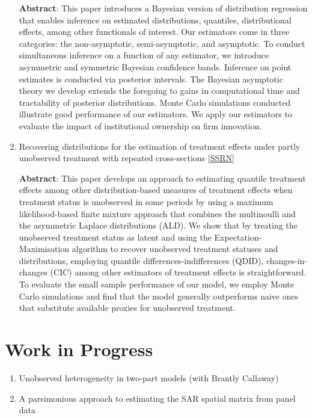 \documentclass[12pt,letterpaper]{article}
\begin{document}
\begin{enumerate}
	\textbf{Abstract}: This paper introduces a Bayesian version of distribution regression that enables inference on estimated distributions, quantiles, distributional effects, among other functionals of interest. Our estimators come in three categories: the non-asymptotic, semi-asymptotic, and asymptotic. To conduct simultaneous inference on a function of any estimator, we introduce asymmetric and symmetric Bayesian confidence bands. Inference on point estimates is conducted via posterior intervals. The Bayesian asymptotic theory we develop extends the foregoing to gains in computational time and tractability of posterior distributions. Monte Carlo simulations conducted illustrate good performance of our estimators. We apply our estimators to evaluate the impact of institutional ownership on firm innovation. 
	
	\item Recovering distributions for the estimation of treatment
	effects under partly unobserved treatment with repeated
	cross-sections  [\href{https://papers.ssrn.com/sol3/papers.cfm?abstract_id=3194286}{SSRN}] 
	
	\textbf{Abstract}: This paper develops an approach to estimating quantile treatment effects among other distribution-based measures of treatment effects when treatment status is unobserved in some periods by using a maximum likelihood-based finite mixture approach that combines the multinoulli and the asymmetric Laplace distributions (ALD). We show that by treating the unobserved treatment status as latent and using the Expectation-Maximisation algorithm to recover unobserved treatment statuses and distributions, employing quantile differences-indifferences (QDID), changes-in-changes (CIC) among other estimators of treatment effects is straightforward. To evaluate the small sample performance of our model, we employ Monte Carlo simulations and find that the model generally outperforms naive ones that substitute available proxies for unobserved treatment.
\end{enumerate}

\section*{Work in Progress}
\begin{enumerate}
	\item Unobserved heterogeneity in two-part models (with Brantly Callaway)
	\item A parsimonious approach to estimating the SAR spatial matrix from panel data
\end{enumerate}
\end{document}
